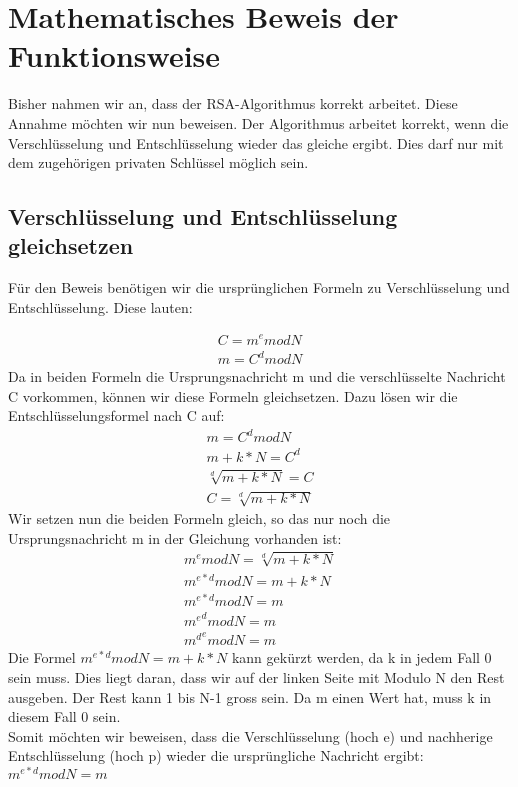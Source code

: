 \section{Mathematisches Beweis der Funktionsweise}
Bisher nahmen wir an, dass der RSA-Algorithmus korrekt arbeitet. Diese Annahme möchten wir nun beweisen. Der Algorithmus arbeitet korrekt, wenn die Verschlüsselung und Entschlüsselung wieder das gleiche ergibt. Dies darf nur mit dem zugehörigen privaten Schlüssel möglich sein.

\subsection{Verschlüsselung und Entschlüsselung gleichsetzen}
Für den Beweis benötigen wir die ursprünglichen Formeln zu Verschlüsselung und Entschlüsselung. Diese lauten:

\begin{align}
  C = m^e mod N \\
  m = C^d mod N
\end{align}
Da in beiden Formeln die Ursprungsnachricht m und die verschlüsselte Nachricht C vorkommen, können wir diese Formeln gleichsetzen. Dazu lösen wir die Entschlüsselungsformel nach C auf:
\begin{align}
  m = C^d mod N \\
  m + k * N = C^d \\
  \sqrt[d]{m+k*N} = C \\
  C = \sqrt[d]{m+k*N}
\end{align}
Wir setzen nun die beiden Formeln gleich, so das nur noch die Ursprungsnachricht m in der Gleichung vorhanden ist:
\begin{align}
  m^e mod N = \sqrt[d]{m+k*N}\\
  m^{e*d} mod N = m + k * N\\
  m^{e*d} mod N = m \\ 
  {m^e}^d mod N = m \\
  {m^d}^e mod N = m
\end{align}
Die Formel $ m^{e*d} mod N = m + k * N $ kann gekürzt werden, da k in jedem Fall 0 sein muss. Dies liegt daran, dass wir auf der linken Seite mit Modulo N den Rest ausgeben. Der Rest kann 1 bis N-1 gross sein. Da m einen Wert hat, muss k in diesem Fall 0 sein. \\
Somit möchten wir beweisen, dass die Verschlüsselung (hoch e) und nachherige Entschlüsselung (hoch p) wieder die ursprüngliche Nachricht ergibt:
$ m^{e*d} mod N = m $

